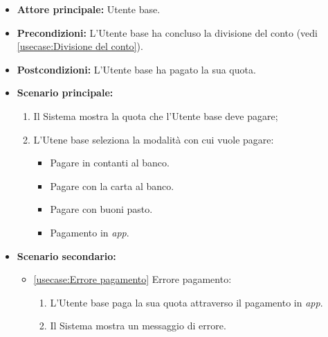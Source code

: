 \label{usecase:Pagamento del conto}
\begin{itemize}
	\item \textbf{Attore principale:} Utente base.

	\item \textbf{Precondizioni:} L'Utente base ha concluso la divisione del conto (vedi \autoref{usecase:Divisione del conto}).

	\item \textbf{Postcondizioni:} L'Utente base ha pagato la sua quota.

	\item \textbf{Scenario principale:}
            \begin{enumerate}
                \item Il Sistema mostra la quota che l'Utente base deve pagare;
                \item L'Utene base seleziona la modalità con cui vuole pagare:
                \begin{itemize}
                    \item Pagare in contanti al banco.
                    \item Pagare con la carta al banco.
                    \item Pagare con buoni pasto.
                    \item Pagamento in \textit{app}.
                \end{itemize}
	      \end{enumerate}

    \item \textbf{Scenario secondario:}
		  \begin{itemize}
			  \item \autoref{usecase:Errore pagamento} Errore pagamento:
				\begin{enumerate}
					\item L'Utente base paga la sua quota attraverso il pagamento in \textit{app}.
	
					\item  Il Sistema mostra un messaggio di errore.
				\end{enumerate}
		  \end{itemize}
\end{itemize}
